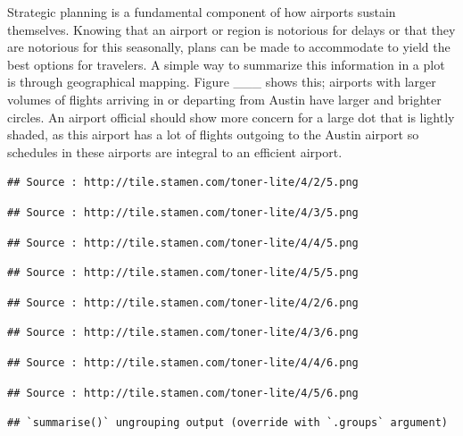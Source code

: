 \documentclass[
]{article}
\begin{document}
Strategic planning is a fundamental component of how airports sustain
themselves. Knowing that an airport or region is notorious for delays or
that they are notorious for this seasonally, plans can be made to
accommodate to yield the best options for travelers. A simple way to
summarize this information in a plot is through geographical mapping.
Figure \_\_\_ shows this; airports with larger volumes of flights
arriving in or departing from Austin have larger and brighter circles.
An airport official should show more concern for a large dot that is
lightly shaded, as this airport has a lot of flights outgoing to the
Austin airport so schedules in these airports are integral to an
efficient airport.

\begin{verbatim}
## Source : http://tile.stamen.com/toner-lite/4/2/5.png
\end{verbatim}

\begin{verbatim}
## Source : http://tile.stamen.com/toner-lite/4/3/5.png
\end{verbatim}

\begin{verbatim}
## Source : http://tile.stamen.com/toner-lite/4/4/5.png
\end{verbatim}

\begin{verbatim}
## Source : http://tile.stamen.com/toner-lite/4/5/5.png
\end{verbatim}

\begin{verbatim}
## Source : http://tile.stamen.com/toner-lite/4/2/6.png
\end{verbatim}

\begin{verbatim}
## Source : http://tile.stamen.com/toner-lite/4/3/6.png
\end{verbatim}

\begin{verbatim}
## Source : http://tile.stamen.com/toner-lite/4/4/6.png
\end{verbatim}

\begin{verbatim}
## Source : http://tile.stamen.com/toner-lite/4/5/6.png
\end{verbatim}

\begin{verbatim}
## `summarise()` ungrouping output (override with `.groups` argument)
\end{verbatim}
\end{document}
